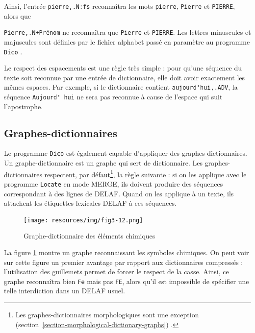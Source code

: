 \noindent Ainsi, l’entrée \verb$pierre,.N:fs$ reconnaîtra les mots \verb+pierre+,
\verb+Pierre+ et \verb+PIERRE+, alors que

\noindent \verb$Pierre,.N+Prénom$ ne reconnaîtra que \verb+Pierre+ et \verb+PIERRE+. Les lettres
minuscules et majuscules sont définies par le fichier alphabet passé en paramètre au programme
\verb+Dico+
.

\bigskip
\noindent Le respect des espacements est une règle très simple : pour qu’une séquence du texte
soit reconnue par une entrée de dictionnaire, elle doit avoir exactement les mêmes espaces.
Par exemple, si le dictionnaire contient \verb+aujourd'hui,.ADV+, la séquence \verb+Aujourd' hui+
ne sera pas reconnue à cause de l’espace qui suit l’apostrophe.


\subsection{Graphes-dictionnaires}
\label{section-dictionary-graphs}
Le programme \verb+Dico+ est également capable
d’appliquer des graphes-dictionnaires.
Un graphe-dic\-tion\-naire est un graphe qui sert de dictionnaire.
Les graphes-dictionnaires respectent,
par défaut\footnote{Les graphes-dictionnaires morphologiques sont une exception
(section~\ref{section-morphological-dictionary-graphs}) .}, la règle suivante :
si on les applique avec le programme \verb+Locate+ en mode MERGE, ils doivent produire des séquences
correspondant à des lignes de DELAF.
Quand on les applique à un texte, ils attachent les étiquettes lexicales DELAF à ces séquences.


\begin{figure}[!p]
\begin{center}
\texttt{[image: resources/img/fig3-12.png]}
\caption{Graphe-dictionnaire des éléments chimiques\label{elements}}
\end{center}
\end{figure}

\bigskip
\noindent La figure \ref{elements} montre un graphe reconnaissant les symboles chimiques. On peut
voir sur cette figure un premier avantage par rapport aux dictionnaires compressés : l’utilisation
des guillemets permet de forcer le respect de la casse. Ainsi, ce graphe reconnaîtra bien \verb+Fe+
mais pas \verb+FE+, alors qu’il est impossible de spécifier une telle interdiction dans un DELAF
usuel.

